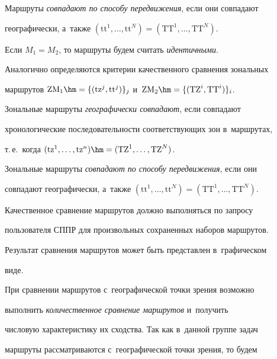 Маршруты \textit{совпадают по способу передвижения}, если они совпадают 


географически, а~так\-же $(\mathrm{tt}^1, \ldots, \mathrm{tt}^N) = (\mathrm{TT}^1, \ldots, \mathrm{TT}^N)$.





Если $M_1 = M_2$, то маршруты будем считать \textit{идентичными}.





Аналогично определяются критерии качественного сравнения зональных 


маршрутов $\mathrm{ZM}_1 \hm= \{(\mathrm{tz}^j, \mathrm{tt}^j)\}_j$ и~$\mathrm{ZM}_2 \hm= 


\{(\mathrm{TZ}^i, \mathrm{TT}^i)\}_i$.





Зональные маршруты \textit{географически совпадают}, если совпадают 


хронологические последовательности соответствующих зон в~маршрутах, 


т.\,е.\ когда $(\mathrm{tz}^1, \ldots, \mathrm{tz}^n) \hm= (\mathrm{TZ}^1, \ldots, \mathrm{TZ}^N)$.





Зональные маршруты \textit{совпадают по способу передвижения}, если они 


совпадают географически, а~также $(\mathrm{tt}^1, \ldots, \mathrm{tt}^N) = (\mathrm{TT}^1, \ldots, \mathrm{TT}^N)$.





Качественное сравнение маршрутов должно выполняться по запросу 


пользователя СППР для произвольных сохраненных наборов маршрутов. 


Результат сравнения маршрутов может быть пред\-став\-лен в~графическом 


виде.





При сравнении маршрутов с~географической точки зрения воз\-мож\-но 


выполнить \textit{количественное сравнение маршрутов} и~получить 


чис\-ло\-вую характеристику их сходства. Так как в~данной группе задач 


маршруты рас\-смат\-ри\-ва\-ют\-ся с~географической точки зрения, то будем 


